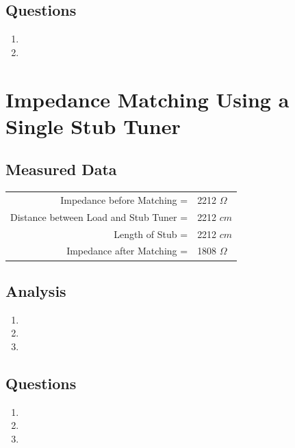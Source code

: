 \documentclass{article}
\begin{document}
\subsection{Questions}
\begin{enumerate}
	\item
	\item
\end{enumerate}
\section{Impedance Matching Using a Single Stub Tuner}
\subsection{Measured Data}
\begin{table}[h]
\centering
	\begin{tabular}{rl}
	Impedance before Matching =   			 & 2212 $\Omega$  \\
	Distance between Load and Stub Tuner =   & 2212 $cm$  \\
	Length of Stub =   						 & 2212 $cm$  \\
	Impedance after Matching =  			 & 1808 $\Omega$      
	\end{tabular}
\end{table}
\subsection{Analysis}
\begin{enumerate}
	\item
	\item
	\item
\end{enumerate}
\subsection{Questions}
\begin{enumerate}
	\item
	\item
	\item
\end{enumerate}
\end{document}
